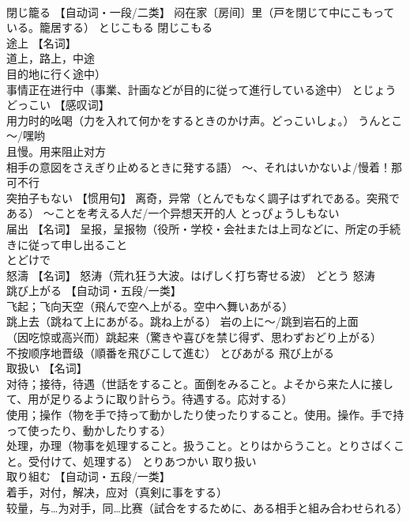\documentclass[8pt]{extreport}
\begin{document}
\begin{CJK}{UTF8}{min}
\\	閉じ籠る	【自动词・一段/二类】 闷在家〔房间〕里（戸を閉じて中にこもっている。籠居する）	とじこもる	閉じこもる
\\	途上	【名词】 
\\	道上，路上，中途
\\	目的地に行く途中） 
\\	事情正在进行中（事業、計画などが目的に従って進行している途中）	とじょう	
\\	どっこい	【感叹词】 
\\	用力时的吆喝（力を入れて何かをするときのかけ声。どっこいしょ。） うんとこ～/嘿哟 
\\	且慢。用来阻止对方
\\	相手の意図をさえぎり止めるときに発する語） ～、それはいかないよ/慢着！那可不行		
\\	突拍子もない	【惯用句】 离奇，异常（とんでもなく調子はずれである。突飛である） ～ことを考える人だ/一个异想天开的人	とっぴょうしもない	
\\	届出	【名词】 呈报，呈报物（役所・学校・会社または上司などに、所定の手続きに従って申し出ること 
\\	とどけで	
\\	怒濤	【名词】 怒涛（荒れ狂う大波。はげしく打ち寄せる波）	どとう	怒涛
\\	跳び上がる	【自动词・五段/一类】 
\\	飞起；飞向天空（飛んで空へ上がる。空中へ舞いあがる） 
\\	跳上去（跳ねて上にあがる。跳ね上がる） 岩の上に～/跳到岩石的上面 
\\	（因吃惊或高兴而）跳起来（驚きや喜びを禁じ得ず、思わずおどり上がる） 
\\	不按顺序地晋级（順番を飛びこして進む）	とびあがる	飛び上がる
\\	取扱い	【名词】 
\\	对待；接待，待遇（世話をすること。面倒をみること。よそから来た人に接して、用が足りるように取り計らう。待遇する。応対する） 
\\	使用；操作（物を手で持って動かしたり使ったりすること。使用。操作。手で持って使ったり、動かしたりする） 
\\	处理，办理（物事を処理すること。扱うこと。とりはからうこと。とりさばくこと。受付けて、処理する）	とりあつかい	取り扱い
\\	取り組む	【自动词・五段/一类】 
\\	着手，对付，解决，应对（真剣に事をする） 
\\	较量，与…为对手，同…比赛（試合をするために、ある相手と組み合わせられる） 

\end{CJK}
\end{document}
